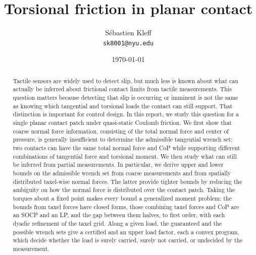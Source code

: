 \documentclass[11pt,a4paper]{article}
\title{\textbf{Torsional friction in planar contact}}
\author{Sébastien Kleff\\[2pt]
\small\texttt{sk8001@nyu.edu}}
\date{\today}
\theoremstyle{plain}
\begin{document}
\maketitle


\begin{abstract}
Tactile sensors are widely used to detect slip, but much less is known about what can actually be inferred about frictional contact limits from tactile measurements. This question matters because detecting that slip is occurring or imminent is not the same as knowing which tangential and torsional loads the contact can still support. That distinction is important for control design. In this report, we study this question for a single planar contact patch under quasi-static Coulomb friction. We first show that coarse normal force information, consisting of the total normal force and center of pressure, is generally insufficient to determine the admissible tangential wrench set: two contacts can have the same total normal force and CoP while supporting different combinations of tangential force and torsional moment. We then study what can still be inferred from partial measurements. In particular, we derive upper and lower bounds on the admissible wrench set from coarse measurements and from spatially distributed taxel-wise normal forces. The latter provide tighter bounds by reducing the ambiguity on how the normal force is distributed over the contact patch. Taking the torques about a fixed point makes every bound a generalized moment problem: the bounds from taxel forces have closed forms, those combining taxel forces and CoP are an SOCP and an LP, and the gap between them halves, to first order, with each dyadic refinement of the taxel grid. Along a given load, the guaranteed and the possible wrench sets give a certified and an upper load factor, each a convex program, which decide whether the load is surely carried, surely not carried, or undecided by the measurement.
\end{abstract}
\end{document}
